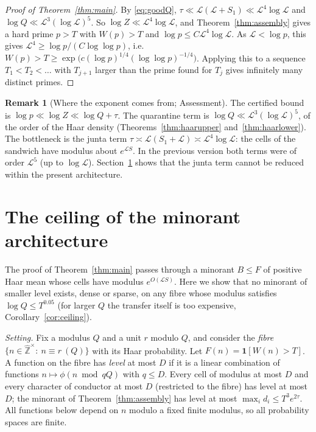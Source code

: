 \documentclass[11pt,reqno]{amsart}
\theoremstyle{definition}
\newtheorem{remark}[theorem]{Remark}
\newcommand{\Lc}{\mathcal L}
\begin{document}
\begin{proof}[Proof of Theorem~\ref{thm:main}]
By \eqref{eq:goodQ}, $\tau\ll\Lc(\Lc+S_1)\ll\Lc^4\log\Lc$ and
$\log Q\ll\Lc^3(\log\Lc)^5$.  So $\log Z\ll\Lc^4\log\Lc$, and
Theorem~\ref{thm:assembly} gives a hard prime $p>T$ with $W(p)>T$ and
$\log p\le C\Lc^4\log\Lc$.  As $\Lc<\log p$, this gives
$\Lc^4\ge\log p/(C\log\log p)$, i.e.\
$W(p)>T\ge\exp\big(c(\log p)^{1/4}(\log\log p)^{-1/4}\big)$.  Applying this to a
sequence $T_1<T_2<\dots$ with $T_{j+1}$ larger than the prime found for $T_j$
gives infinitely many distinct primes.
\end{proof}

\begin{remark}[Where the exponent comes from; Assessment]\label{rem:exponent}
The certified bound is $\log p\ll\log Z\ll\log Q+\tau$.  The quarantine term
is $\log Q\ll\Lc^3(\log\Lc)^5$, of the order of the Haar density
(Theorems~\ref{thm:haarupper} and~\ref{thm:haarlower}).  The bottleneck is
the junta term $\tau\asymp\Lc(S_1+\Lc)\asymp\Lc^4\log\Lc$: the cells of the
sandwich have modulus about $e^{\Lc S}$.  In the previous version both terms
were of order $\Lc^5$ (up to $\log\Lc$).  Section~\ref{sec:ceiling} shows
that the junta term cannot be reduced within the present architecture.
\end{remark}

\section{The ceiling of the minorant architecture}\label{sec:ceiling}

The proof of Theorem~\ref{thm:main} passes through a minorant $B\le F$ of
positive Haar mean whose cells have modulus $e^{O(\Lc S)}$.  Here we show
that no minorant of smaller level exists, dense or sparse, on any fibre
whose modulus satisfies $\log Q\le T^{0.05}$ (for larger $Q$ the transfer
itself is too expensive, Corollary~\ref{cor:ceiling}).

\emph{Setting.}  Fix a modulus $Q$ and a unit $r$ modulo $Q$, and consider the
\emph{fibre} $\{n\in\hat{\mathbb Z}^\times:\ n\equiv r\ (Q)\}$ with its Haar
probability.  Let $F(n)=\mathbf 1[W(n)>T]$.  A function on the fibre has
\emph{level} at most $D$ if it is a linear combination of functions
$n\mapsto\phi(n\bmod qQ)$ with $q\le D$.  Every cell of modulus at most $D$
and every character of conductor at most $D$ (restricted to the fibre) has
level at most $D$; the minorant of Theorem~\ref{thm:assembly} has level at
most $\max_id_i\le T^3e^{2\tau}$.  All functions below depend on $n$ modulo a
fixed finite modulus, so all probability spaces are finite.
\end{document}
